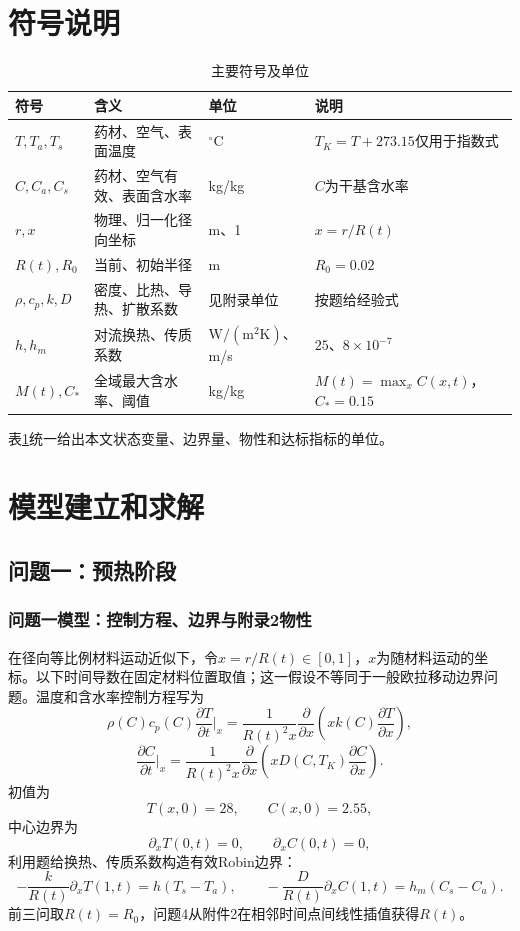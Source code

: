 \documentclass[UTF8,zihao=-4,a4paper]{ctexart}
\begin{document}
\section{符号说明}
\begin{table}[H]\centering\small\caption{主要符号及单位}\label{tab:symbols}
\begin{tabular}{p{}p{}p{}p{}}
\toprule
符号&含义&单位&说明\\
\midrule
$T,T_a,T_s$&药材、空气、表面温度&$^{\circ}\mathrm C$&$T_K=T+273.15$仅用于指数式\\
$C,C_a,C_s$&药材、空气有效、表面含水率&kg/kg&$C$为干基含水率\\
$r,x$&物理、归一化径向坐标&m、1&$x=r/R(t)$\\
$R(t),R_0$&当前、初始半径&m&$R_0=0.02$\\
$\rho,c_p,k,D$&密度、比热、导热、扩散系数&见附录单位&按题给经验式\\
$h,h_m$&对流换热、传质系数&$\mathrm{W/(m^2K)}$、m/s&$25$、$8\times10^{-7}$\\
$M(t),C_*$&全域最大含水率、阈值&kg/kg&$M(t)=\max_xC(x,t)$，$C_*=0.15$\\
\bottomrule
\end{tabular}\end{table}
表\ref{tab:symbols}统一给出本文状态变量、边界量、物性和达标指标的单位。

\section{模型建立和求解}
\subsection{问题一：预热阶段}
\subsubsection{问题一模型：控制方程、边界与附录2物性}
在径向等比例材料运动近似下，令$x=r/R(t)\in[0,1]$，$x$为随材料运动的坐标。以下时间导数在固定材料位置取值；这一假设不等同于一般欧拉移动边界问题。温度和含水率控制方程写为
\begin{equation}
\rho(C)c_p(C)\frac{\partial T}{\partial t}\bigg|_x
=\frac{1}{R(t)^2x}\frac{\partial}{\partial x}
\left(xk(C)\frac{\partial T}{\partial x}\right),
\end{equation}
\begin{equation}
\frac{\partial C}{\partial t}\bigg|_x
=\frac{1}{R(t)^2x}\frac{\partial}{\partial x}
\left(xD(C,T_K)\frac{\partial C}{\partial x}\right).
\end{equation}
初值为
\begin{equation}
T(x,0)=28,\qquad C(x,0)=2.55,
\end{equation}
中心边界为
\begin{equation}
\partial_xT(0,t)=0,\qquad\partial_xC(0,t)=0,
\end{equation}
利用题给换热、传质系数构造有效Robin边界：
\begin{equation}
-\frac{k}{R(t)}\partial_xT(1,t)=h(T_s-T_a),\qquad
-\frac{D}{R(t)}\partial_xC(1,t)=h_m(C_s-C_a).
\end{equation}
前三问取$R(t)=R_0$，问题4从附件2在相邻时间点间线性插值获得$R(t)$。
\end{document}
